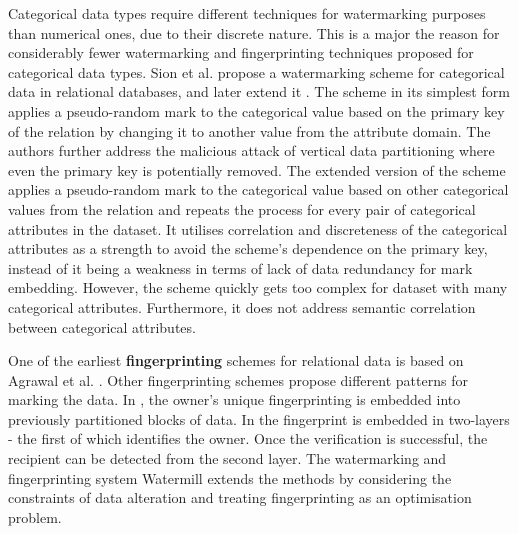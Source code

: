 \documentclass[runningheads]{llncs}
\begin{document}
Categorical data types require different techniques for watermarking purposes than numerical ones, due to their discrete nature.
This is a major the reason for considerably fewer watermarking and fingerprinting techniques proposed for categorical data types. 
Sion et al. \cite{sion2004proving} propose a watermarking scheme for categorical data in relational databases, and later extend it \cite{sion2004rights}.
The scheme in its simplest form applies a pseudo-random mark to the categorical value based on the primary key of the relation by changing it to another value from the attribute domain.
The authors further address the malicious attack of vertical data partitioning where even the primary key is potentially removed.
The extended version of the scheme applies a pseudo-random mark to the categorical value based on other categorical values from the relation and repeats the process for every pair of categorical attributes in the dataset.
It utilises correlation and discreteness of the categorical attributes as a strength to avoid the scheme’s dependence on the primary key, instead of it being a weakness in terms of lack of data redundancy for mark embedding.
However, the scheme quickly gets too complex for dataset with many categorical attributes.
Furthermore, it does not address semantic correlation between categorical attributes.

One of the earliest \textbf{fingerprinting} schemes for relational data \cite{li2005fingerprinting} is based on Agrawal et al. \cite{agrawal2003watermarking}.
Other fingerprinting schemes propose different patterns for marking the data. In \cite{liu2004block}, the owner’s unique fingerprinting is embedded into previously partitioned blocks of data.
In \cite{guo2006fingerprinting} the fingerprint is embedded in two-layers - the first of which identifies the owner. Once the verification is successful, the recipient can be detected from the second layer.
The watermarking and fingerprinting system Watermill \cite{lafaye_watermill:_2008} extends the methods by considering the constraints of data alteration and treating fingerprinting as an optimisation problem.
\end{document}
